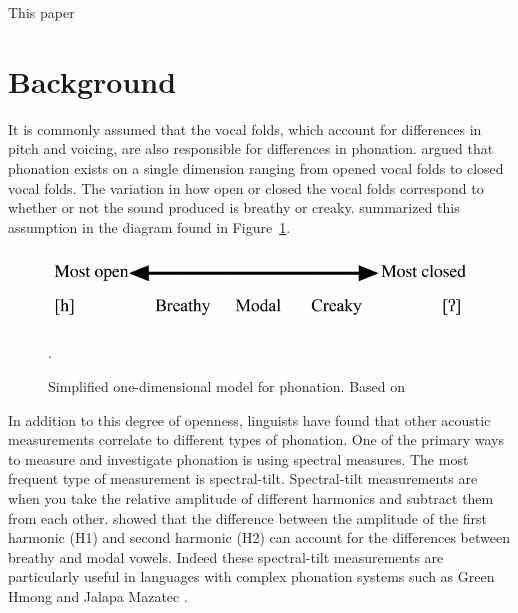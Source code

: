 \documentclass[12pt, letterpaper]{article}
\begin{document}
This paper 

\section{Background} \label{sec:Background}

It is commonly assumed that the vocal folds, which account for differences in pitch and voicing, are also responsible for differences in phonation. \citet{ladefogedPreliminariesLinguisticPhonetics1971,gordonPhonationTypesCrosslinguistic2001} argued that phonation exists on a single dimension ranging from opened vocal folds to closed vocal folds. The variation in how open or closed the vocal folds correspond to whether or not the sound produced is breathy or creaky. \citet{ladefogedPreliminariesLinguisticPhonetics1971,gordonPhonationTypesCrosslinguistic2001} summarized this assumption in the diagram found in Figure~\ref{fig:Phonation}.

\begin{figure}[!h]
	\centering
	\includegraphics[width=.6\textwidth]{Images/Phonation.png}
	\caption{Simplified one-dimensional model for phonation. Based on \citet{ladefogedPreliminariesLinguisticPhonetics1971,gordonPhonationTypesCrosslinguistic2001}}.
	\label{fig:Phonation}
\end{figure}

In addition to this degree of openness, linguists have found that other acoustic measurements correlate to different types of phonation. One of the primary ways to measure and investigate phonation is using spectral measures. The most frequent type of measurement is spectral-tilt. Spectral-tilt measurements are when you take the relative amplitude of different harmonics and subtract them from each other. \cite{fischer-jorgensenPhoneticAnalysisBreathy1968} showed that the difference between the amplitude of the first harmonic (H1) and second harmonic (H2) can account for the differences between breathy and modal vowels. Indeed these spectral-tilt measurements are particularly useful in languages with complex phonation systems such as Green Hmong \citep{huffmanMeasuresPhonationType1987,andruskiPhonationTypesProduction2000} and Jalapa Mazatec \citep{silvermanPhoneticStructuresJalapa1995,blankenshipTimeCourseBreathiness1997}.
\end{document}
